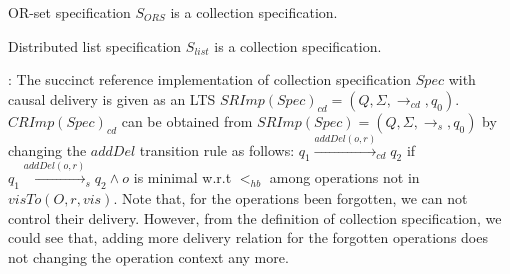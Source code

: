 
{\color {red}
\begin{lemma}
\label{lemma:OR-set is collection specification}
OR-set specification $S_{\mathit{ORS}}$ is a collection specification. 
\end{lemma}
}


{\color {red}
\begin{lemma}
\label{lemma:list is collection specification}
Distributed list specification $S_{\mathit{list}}$ is a collection specification. 
\end{lemma}
}


: The succinct reference implementation of collection specification $\mathit{Spec}$ with causal delivery is given as an LTS $\mathit{SRImp}(\mathit{Spec})_{\mathit{cd}} = (Q,\Sigma,\rightarrow_{\mathit{cd}},q_0)$. $\mathit{CRImp}(\mathit{Spec})_{\mathit{cd}}$ can be obtained from $\mathit{SRImp}(\mathit{Spec}) = (Q,\Sigma,\rightarrow_s,q_0)$ by changing the $\mathit{addDel}$ transition rule as follows: $q_1 {\xrightarrow{\mathit{addDel}(o,r)}}_{cd} q_2$ if $q_1 {\xrightarrow{\mathit{addDel}(o,r)}}_s q_2 \wedge o$ is minimal w.r.t $<_{hb}$ among operations not in $\mathit{visTo}(O,r,\mathit{vis})$. %
{\color {red}Note that, for the operations been forgotten, we can not control their delivery. However, from the definition of collection specification, we could see that, adding more delivery relation for the forgotten operations does not changing the operation context any more.} 
























